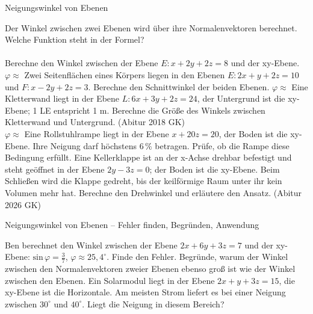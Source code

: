 \setcounter{aufgabe}{13}

\begin{aufgabe}{Neigungswinkel von Ebenen}
\begin{teile}
\teil Der Winkel zwischen zwei Ebenen wird über ihre Normalenvektoren berechnet. Welche Funktion steht in der Formel? \\  \\ 
\teil Berechne den Winkel zwischen der Ebene $E\colon x + 2y + 2z = 8$ und der xy-Ebene. $\varphi \approx$ \leerfeld[$^\circ$]
\teil Zwei Seitenflächen eines Körpers liegen in den Ebenen $E\colon 2x + y + 2z = 10$ und $F\colon x - 2y + 2z = 3$. Berechne den Schnittwinkel der beiden Ebenen. $\varphi \approx$ \leerfeld[$^\circ$]
\teil Eine Kletterwand liegt in der Ebene $L\colon 6x + 3y + 2z = 24$, der Untergrund ist die xy-Ebene; 1 LE entspricht 1 m. Berechne die Größe des Winkels zwischen Kletterwand und Untergrund. \hfill (Abitur 2018 GK) \\ $\varphi \approx$ \leerfeld[$^\circ$]
\teil Eine Rollstuhlrampe liegt in der Ebene $x + 20z = 20$, der Boden ist die xy-Ebene. Ihre Neigung darf höchstens $6\,\%$ betragen. Prüfe, ob die Rampe diese Bedingung erfüllt.
\teil Eine Kellerklappe ist an der x-Achse drehbar befestigt und steht geöffnet in der Ebene $2y - 3z = 0$; der Boden ist die xy-Ebene. Beim Schließen wird die Klappe gedreht, bis der keilförmige Raum unter ihr kein Volumen mehr hat. Berechne den Drehwinkel und erläutere den Ansatz. \hfill (Abitur 2026 GK)
\end{teile}
\end{aufgabe}

\begin{aufgabe}{Neigungswinkel von Ebenen – Fehler finden, Begründen, Anwendung}
\begin{teile}
\teil Ben berechnet den Winkel zwischen der Ebene $2x + 6y + 3z = 7$ und der xy-Ebene: $\mathrm{sin}\,\varphi = \frac{3}{7}$, $\varphi \approx 25{,}4^\circ$. Finde den Fehler.
\teil Begründe, warum der Winkel zwischen den Normalenvektoren zweier Ebenen ebenso groß ist wie der Winkel zwischen den Ebenen.
\teil Ein Solarmodul liegt in der Ebene $2x + y + 3z = 15$, die xy-Ebene ist die Horizontale. Am meisten Strom liefert es bei einer Neigung zwischen $30^\circ$ und $40^\circ$. Liegt die Neigung in diesem Bereich?
\end{teile}
\end{aufgabe}
